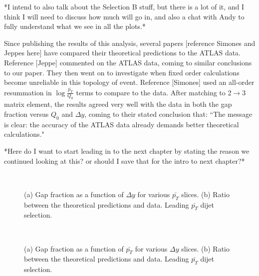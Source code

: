 *I intend to also talk about the Selection B stuff, but there is a lot of it, and I think I will need to discuss how much will go in, and also a chat with Andy to fully understand what we see in all the plots.*


Since publishing the results of this analysis, several papers [reference Simones and Jeppes here] have compared  their theoretical predictions to the ATLAS data. 
Reference [Jeppe] commented on the ATLAS data, coming to similar conclusions to our paper. They then went on to investigate when fixed order calculations become unreliable in this topology of event.
Reference [Simones] used an all-order resummation in $\log\frac{\bar{p_T}}{Q_0}$ terms to compare to the data. After matching to 2$\rightarrow$3 matrix element, the results agreed very well with the data in both the gap fraction versus $Q_0$ and  $\Delta y$, coming to their stated conclusion that: ``The message is clear: the accuracy of the ATLAS data already demands better theoretical calculations."

*Here do I want to start leading in to the next chapter by stating the reason we continued looking at this? or should I save that for the intro to next chapter?*


\begin{figure}
\centering
\mbox{
              \quad
              \quad
}
\caption[Gap fraction as a function of $\Delta y$ for leading $p_T$ dijet selection]{ (a) Gap fraction as a function of $\Delta y$ for various $\bar{p_T}$ slices. (b) Ratio between the theoretical predictions and data. Leading $\bar{p_T}$ dijet selection.
\label{GBJ1:dYSelA}}
\end{figure}



\begin{figure}
\centering
\mbox{
              \quad
              \quad
}
\caption[Gap fraction as a function of $\bar{p_T}$ for leading $p_T$ dijet selection]{ (a) Gap fraction as a function of $\bar{p_T}$ for various $\Delta y$ slices. (b) Ratio between the theoretical predictions and data. Leading $\bar{p_T}$ dijet selection.
\label{GBJ1:pTSelA}}
\end{figure}



